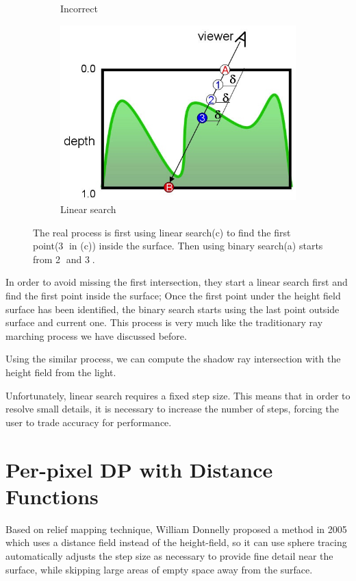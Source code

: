 \begin{figure}
\begin{subfigure}[t]{.33\textwidth}
		\caption{Incorrect}
	\end{subfigure}
	\begin{subfigure}[t]{.33\textwidth}
		\includegraphics[width=1.0\textwidth]{graphics/df/relief-mapping3}
		\caption{Linear search}
	\end{subfigure}
	\caption{The real process is first using linear search(c) to find the first point(\textcircled{3} in (c)) inside the surface. Then using binary search(a) starts from \textcircled{2} and \textcircled{3}.}
\end{figure}

In order to avoid missing the first intersection, they start a linear search first and find the first point inside the surface; Once the first point under the height field surface has been identified, the binary search starts using the last point outside surface and current one. This process is very much like the traditionary ray marching process we have discussed before.

Using the similar process, we can compute the shadow ray intersection with the height field from the light.

Unfortunately, linear search requires a fixed step size. This means that in order to resolve small details, it is necessary to increase the number of steps, forcing the user to trade accuracy for performance.


\section{Per-pixel DP with Distance Functions}
Based on relief mapping technique, William Donnelly proposed a method in 2005\cite{a:Per-PixelDisplacementMappingwithDistanceFunctions} which uses a distance field instead of the height-field, so it can use sphere tracing automatically adjusts the step size as necessary to provide fine detail near the surface, while skipping large areas of empty space away from the surface.

